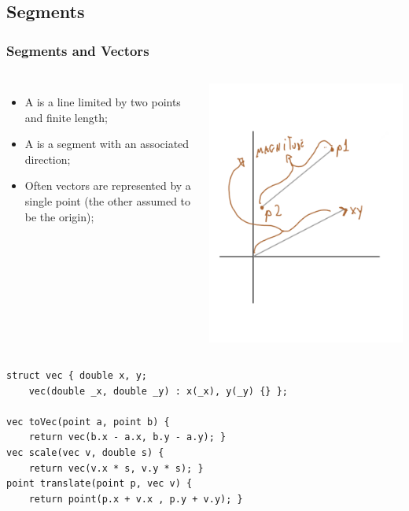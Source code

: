 \documentclass{beamer}
\begin{document}
\subsection{Segments}
\begin{frame}
  \frametitle{Segments and Vectors}
  {\smaller
    \begin{columns}
      \begin{itemize}
      \item A  is a line limited by two points and finite length;
      \item A  is a segment with an associated direction;
      \item Often vectors are represented by a single point
        (the other assumed to be the origin);
      \end{itemize}
      \includegraphics[width=.95\textwidth]{../img/geom4}
    \end{columns}
    \begin{exampleblock}{}
\begin{verbatim}
struct vec { double x, y; 
    vec(double _x, double _y) : x(_x), y(_y) {} };

vec toVec(point a, point b) { 
    return vec(b.x - a.x, b.y - a.y); }
vec scale(vec v, double s) { 
    return vec(v.x * s, v.y * s); }
point translate(point p, vec v) { 
    return point(p.x + v.x , p.y + v.y); }
\end{verbatim}
    \end{exampleblock}
  }
\end{frame}
\end{document}
